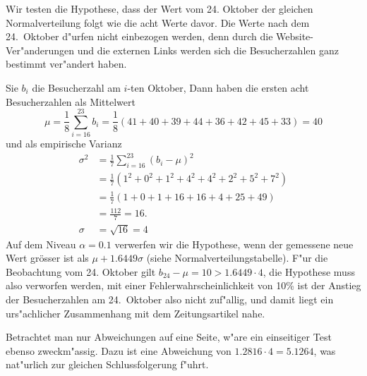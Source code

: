 \begin{loesung}
Wir testen die Hypothese, dass der Wert vom 24. Oktober der gleichen
Normalverteilung folgt wie die acht Werte davor. Die Werte nach
dem 24.~Oktober d"urfen nicht einbezogen werden, denn durch die
Website-Ver"anderungen und die externen Links werden sich die
Besucherzahlen ganz bestimmt ver"andert haben.

Sie $b_i$ die Besucherzahl am $i$-ten Oktober,
Dann haben die ersten acht Besucherzahlen als Mittelwert
$$\mu=\frac18\sum_{i=16}^{23}b_i=\frac18(41+40+39+44+36+42+45+33)=40$$
und als empirische Varianz
\begin{align*}
\sigma^2&=\frac17\sum_{i=16}^{23}(b_i-\mu)^2\\
&=\frac17(1^2+0^2+1^2+4^2+4^2+2^2+5^2+7^2)\\
&=\frac17(1 + 0 + 1 + 16 + 16 + 4 + 25 + 49)\\
&=\frac{112}{7}=16.\\
\sigma&=\sqrt{16}=4
\end{align*}
Auf dem Niveau $\alpha=0.1$ verwerfen wir die Hypothese, wenn der gemessene
neue Wert gr\"osser ist als $\mu + 1.6449\sigma$
(siehe Normalverteilungstabelle). F"ur die Beobachtung
vom 24. Oktober gilt $b_{24}-\mu=10 > 1.6449\cdot 4$, die Hypothese
muss also verworfen werden, mit einer Fehlerwahrscheinlichkeit von 10\%
ist der Anstieg der Besucherzahlen am 24.~Oktober also nicht zuf"allig,
und damit liegt ein urs"achlicher Zusammenhang mit dem Zeitungsartikel nahe.

Betrachtet man nur Abweichungen auf eine Seite, w"are ein einseitiger Test
ebenso zweckm"assig. Dazu ist eine Abweichung von $1.2816\cdot 4=5.1264$,
was nat"urlich zur gleichen Schlussfolgerung f"uhrt.
\end{loesung}

